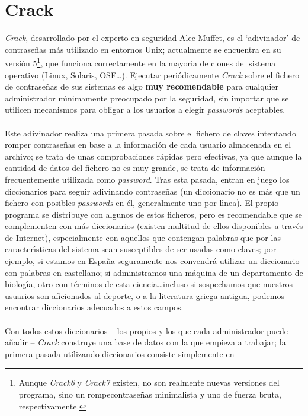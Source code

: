 \section{Crack}
{\it Crack}, desarrollado por el experto en seguridad Alec Muffet, es el
`adivinador' de contrase\~nas m\'as utilizado en entornos Unix; actualmente
se encuentra en su versi\'on 5\footnote{Aunque {\it Crack6} y {\it Crack7}
existen, no son realmente nuevas versiones del programa, sino un
rompecontrase\~nas minimalista y uno de fuerza bruta, respectivamente.}, que
funciona correctamente en la mayor\'{\i}a de clones del sistema operativo 
(Linux, Solaris, OSF\ldots). Ejecutar peri\'odicamente {\it Crack} sobre el
fichero de contrase\~nas de sus sistemas es algo {\bf muy recomendable} para
cualquier administrador m\'{\i}nimamente preocupado por la seguridad, sin
importar que se utilicen mecanismos para obligar a los usuarios a elegir
{\it passwords} aceptables.\\
\\Este adivinador realiza una primera pasada sobre el fichero de claves 
intentando romper contrase\~nas en base a la informaci\'on de cada usuario
almacenada en el archivo; se trata de unas comprobaciones r\'apidas pero
efectivas, ya que aunque la cantidad de datos del fichero no es muy grande, se
trata de informaci\'on frecuentemente utilizada como {\it password}. Tras
esta pasada, entran en juego los diccionarios para seguir adivinando 
contrase\~nas (un diccionario no es m\'as que un fichero con posibles {\it
passwords} en \'el, generalmente uno por l\'{\i}nea). El propio programa se 
distribuye con algunos de estos ficheros, pero es recomendable que se
complementen con m\'as diccionarios (existen multitud de ellos disponibles a
trav\'es de Internet), especialmente con aquellos que contengan palabras
que por las caracter\'{\i}sticas del sistema sean susceptibles de ser usadas
como claves; por ejemplo, si estamos en Espa\~na seguramente nos convendr\'a
utilizar un diccionario con palabras en castellano; si administramos una 
m\'aquina de un departamento de biolog\'{\i}a, otro con t\'erminos de esta
ciencia\ldots incluso si sospechamos que nuestros usuarios son aficionados al
deporte, o a la literatura griega antigua, podemos encontrar diccionarios
adecuados a estos campos.\\
\\Con todos estos diccionarios -- los propios y los que cada administrador puede
a\~nadir -- {\it Crack} construye una base de datos con la que empieza a 
trabajar; la primera pasada utilizando diccionarios consiste simplemente en
